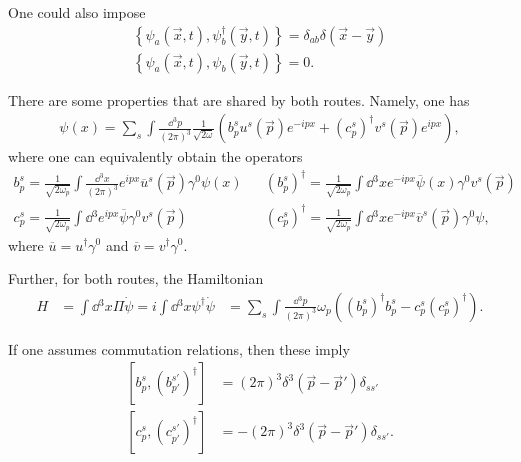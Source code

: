 One could also impose
\begin{align}
    \left\{ \psi_a \left( \vec{x},t \right) , \psi^{\dag}_b \left( \vec{y},t \right)  \right\}  = \delta_{ab} \delta \left( \vec{x} - \vec{y} \right)  \\
    \left\{ \psi_a \left( \vec{x} , t \right) , \psi_b \left( \vec{y},t \right)  \right\}  = 0 
.\end{align}

There are some properties that are shared by both routes. Namely, one has
\begin{align}
    \psi \left( x \right) = \sum_{s}^{} \int \frac{\dd{^3p}}{\left( 2\pi\right)^3} \frac{1}{\sqrt{2\omega}}\left( b_{p}^{s} u^{s}\left( \vec{p} \right) e^{-i px} + \left( c^{s}_p \right)^{\dag}  v^{s}\left( \vec{p} \right) e^{ipx}  \right)  
,\end{align}
where one can equivalently obtain the operators
\begin{align}
    b^{s}_p = \frac{1}{\sqrt{2\omega_p} } \int \frac{\dd{^3x}}{\left( 2\pi\right)^3} e^{ipx} \overline{u}^{s}\left( \vec{p} \right) \gamma^{0} \psi \left( x \right) && (b^{s}_p)^{\dag} = \frac{1}{\sqrt{2\omega_p}} \int \dd{^3x} e^{-ipx} \overline{\psi}\left( x \right) \gamma^{0} v^{s}\left( \vec{p} \right) \\
    c^{s}_p = \frac{1}{\sqrt{2\omega_p} } \int \dd{^3} e^{ipx} \overline{\psi} \gamma^{0} v^{s}\left( \vec{p} \right)  && \left( c^{s}_p \right)^{\dag} = \frac{1}{\sqrt{2\omega_p} } \int \dd{^3x} e^{-ipx} \overline{v}^{s}\left( \vec{p} \right) \gamma^{0} \psi
,\end{align}
where $\overline{u} = u^{\dag} \gamma^{0}$ and $\overline{v} = v^{\dag} \gamma^{0}$.

Further, for both routes, the Hamiltonian
\begin{align}
    H &= \int \dd{^3x} \Pi \dot{\psi} = i \int \dd{^3x} \psi^{\dag} \dot{\psi}
      &= \sum_{s}^{} \int \frac{\dd{^3p}}{\left( 2\pi\right)^3} \omega_p \left( \left( b^{s}_p \right)^{\dag} b_p^{s} - c^{s}_p \left( c^{s}_p \right)^{\dag}  \right)  
.\end{align}

If one assumes commutation relations, then these imply
\begin{align}
    \left[ b_p^{s}, \left( b^{s'}_{p'} \right)^{\dag} \right] &= \left( 2\pi \right)^3 \delta^{3} \left( \vec{p} - \vec{p}' \right) \delta_{s s'} \\
    \left[ c_p^{s}, \left( c^{s'}_{p'} \right)^{\dag} \right] &= -\left( 2\pi \right)^3 \delta^{3} \left( \vec{p} - \vec{p}' \right) \delta_{s s'} 
.\end{align}

